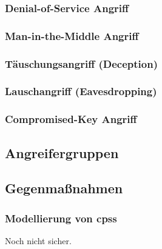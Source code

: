 \documentclass[final,bibliography=totocnumbered]{include/sikseminar}
\begin{document}
\subsubsection{Denial-of-Service Angriff}
\subsubsection{Man-in-the-Middle Angriff}
\subsubsection{T\"auschungsangriff (Deception)} %
\subsubsection{Lauschangriff (Eavesdropping)} %
\subsubsection{Compromised-Key Angriff}

\subsection{Angreifergruppen}\label{subsec:angreifergruppen}


\subsection{Gegenmaßnahmen}\label{subsec:gegenmassnahmen}




\subsubsection{Modellierung von \glspl{cps}}
Noch nicht sicher.
\end{document}
